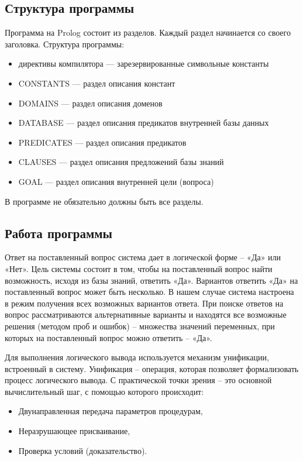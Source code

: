 \subsection*{Структура программы}

Программа на Prolog состоит из разделов. Каждый раздел начинается со своего 
заголовка. Структура программы:

\begin{itemize}
	\item директивы компилятора — зарезервированные символьные константы
	\item CONSTANTS — раздел описания констант
	\item DOMAINS — раздел описания доменов
	\item DATABASE — раздел описания предикатов внутренней базы данных
	\item PREDICATES — раздел описания предикатов
	\item CLAUSES — раздел описания предложений базы знаний
	\item GOAL — раздел описания внутренней цели (вопроса)
\end{itemize}

В программе не обязательно должны быть все разделы.

\subsection*{Работа программы}

Ответ на поставленный вопрос система дает в логической форме -- «Да» или «Нет». Цель системы состоит в том, чтобы на поставленный вопрос найти возможность, исходя из базы знаний, ответить «Да». Вариантов ответить «Да» на поставленный вопрос может быть несколько. В нашем случае система настроена в режим получения всех возможных вариантов ответа. При поиске ответов на вопрос рассматриваются альтернативные варианты и находятся все возможные решения (методом проб и ошибок) -- множества значений переменных, при которых на поставленный вопрос можно ответить -- «Да».

Для выполнения логического вывода используется механизм унификации, встроенный в систему.
Унификация -- операция, которая позволяет формализовать процесс логического вывода. С практической точки зрения -- это основной вычислительный шаг, с помощью которого происходит:
\begin{itemize}
	\item Двунаправленная передача параметров процедурам,
	\item Неразрушающее присваивание,
	\item Проверка условий (доказательство).
\end{itemize}

